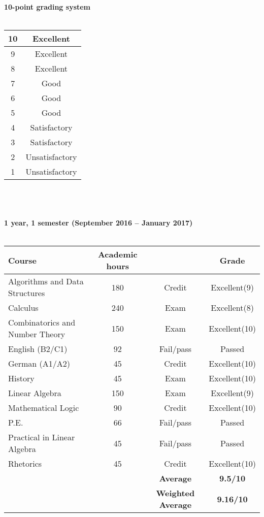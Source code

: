 \documentclass[11pt, a4paper]{report}
\newcommand{\upperRomannumeral}[1]{\uppercase\expandafter{\romannumeral#1}}
\begin{document}
\textbf{10-point grading system}\\ \\
\begin{tabular}{|c|c|}
\hline
10&Excellent\\
\hline
9&Excellent\\
\hline
8&Excellent\\
\hline
7&Good\\
\hline
6&Good\\
\hline
5&Good\\
\hline
4&Satisfactory\\
\hline
3&Satisfactory\\
\hline
2&Unsatisfactory\\
\hline
1&Unsatisfactory\\
\hline
\end{tabular}
\\ \\
\\
\textbf{1 year, 1 semester (September 2016 -- January 2017)}\\ \\
\begin{tabular}{|p{6cm}|c|c|c|}
\hline
\rowcolor{LightCyan}
\textbf{Course}&\textbf{Academic hours}& &\textbf{Grade}\\
\hline
Algorithms and Data Structures \upperRomannumeral{1} & 180 & Credit & Excellent(9)\\
Calculus \upperRomannumeral{1} & 240 & Exam & Excellent(8)\\
Combinatorics and Number Theory & 150 & Exam & Excellent(10) \\
English (B2/C1) & 92 & Fail/pass & Passed\\
German (A1/A2) & 45 & Credit & Excellent(10)\\ 
History & 45 & Exam & Excellent(10)\\
Linear Algebra \upperRomannumeral{1} & 150 & Exam & Excellent(9)\\
Mathematical Logic \upperRomannumeral{1} & 90 & Credit & Excellent(10) \\
P.E. & 66 & Fail/pass & Passed\\Practical in Linear Algebra & 45 & Fail/pass & Passed\\
Rhetorics & 45 & Credit & Excellent(10)\\
\hline
\rowcolor{LightCyan}
&& \textbf{Average} & \textbf{9.5/10} \\
\hline
\rowcolor{LightCyan}
&& \textbf{Weighted Average} & \textbf{9.16/10}\\
\hline
\end{tabular}
\end{document}
